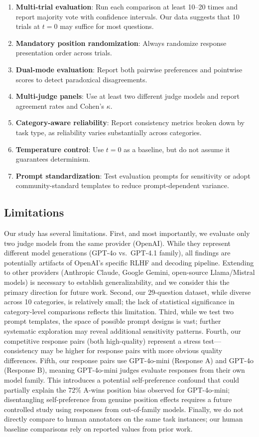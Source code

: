 \documentclass{ijclclp}
\begin{document}
\begin{enumerate}[nosep]
    \item \textbf{Multi-trial evaluation}: Run each comparison at least 10--20 times and report majority vote with confidence intervals. Our data suggests that 10 trials at $t=0$ may suffice for most questions.
    \item \textbf{Mandatory position randomization}: Always randomize response presentation order across trials.
    \item \textbf{Dual-mode evaluation}: Report both pairwise preferences and pointwise scores to detect paradoxical disagreements.
    \item \textbf{Multi-judge panels}: Use at least two different judge models and report agreement rates and Cohen's $\kappa$.
    \item \textbf{Category-aware reliability}: Report consistency metrics broken down by task type, as reliability varies substantially across categories.
    \item \textbf{Temperature control}: Use $t=0$ as a baseline, but do not assume it guarantees determinism.
    \item \textbf{Prompt standardization}: Test evaluation prompts for sensitivity or adopt community-standard templates to reduce prompt-dependent variance.
\end{enumerate}

\subsection{Limitations}

Our study has several limitations. First, and most importantly, we evaluate only two judge models from the same provider (OpenAI). While they represent different model generations (GPT-4o vs.\ GPT-4.1 family), all findings are potentially artifacts of OpenAI's specific RLHF and decoding pipeline. Extending to other providers (Anthropic Claude, Google Gemini, open-source Llama/Mistral models) is necessary to establish generalizability, and we consider this the primary direction for future work. Second, our 29-question dataset, while diverse across 10 categories, is relatively small; the lack of statistical significance in category-level comparisons reflects this limitation. Third, while we test two prompt templates, the space of possible prompt designs is vast; further systematic exploration may reveal additional sensitivity patterns. Fourth, our competitive response pairs (both high-quality) represent a stress test---consistency may be higher for response pairs with more obvious quality differences. Fifth, our response pairs use GPT-4o-mini (Response A) and GPT-4o (Response B), meaning GPT-4o-mini judges evaluate responses from their own model family. This introduces a potential self-preference confound that could partially explain the 72\% A-wins position bias observed for GPT-4o-mini; disentangling self-preference from genuine position effects requires a future controlled study using responses from out-of-family models. Finally, we do not directly compare to human annotators on the same task instances; our human baseline comparisons rely on reported values from prior work.
\end{document}
